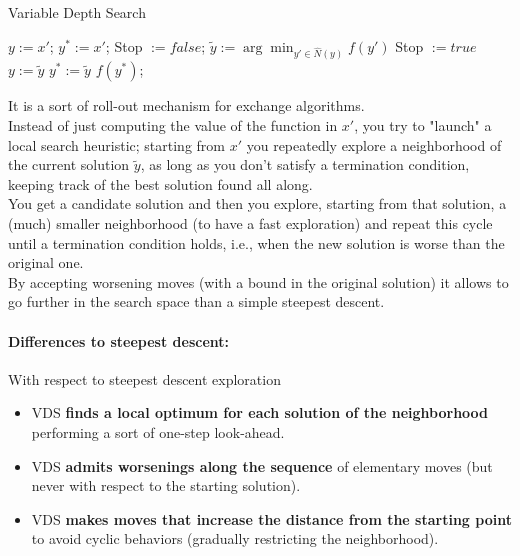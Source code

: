 \begin{algorithm}
	\caption{Variable Depth Search}
	\begin{algorithmic}
		\STATE $y := x'$; $y^\ast := x'$; Stop $:= false$;
		\STATE $\tilde{y} := \arg \min_{y' \in \hat{N}(y)} f(y')$
		\STATE Stop $:= true$
		\ELSE
		\STATE $y := \tilde{y}$
		\ENDIF
		\STATE $y^\ast := \tilde{y}$
		\ENDIF
		\ENDWHILE
		\RETURN $f (y^\ast)$;
	\end{algorithmic}
\end{algorithm}
It is a sort of roll-out mechanism for exchange algorithms.\\

Instead of just computing the value of the function in $x'$, you try to "launch" a local search heuristic; starting from $x'$ you repeatedly explore a neighborhood of the current solution $\tilde{y}$, as long as you don't satisfy a termination condition, keeping track of the best solution found all along.\\

You get a candidate solution and then you explore, starting from that solution, a (much) smaller neighborhood (to have a fast exploration) and repeat this cycle until a termination condition holds, i.e., when the new solution is worse than the original one.\\

By accepting worsening moves (with a bound in the original solution) it allows to go further in the search space than a simple steepest descent.\\

\newpage

\paragraph{Differences to steepest descent:} With respect to steepest descent exploration
\begin{itemize}
	\item VDS \textbf{finds a local optimum for each solution of the neighborhood} performing a sort of one-step look-ahead.\\
	
	\item VDS \textbf{admits worsenings along the sequence} of elementary moves (but never with respect to the starting solution).\\
	
	\item VDS \textbf{makes moves that increase the distance from the starting point} to avoid cyclic behaviors (gradually restricting the neighborhood).\\
\end{itemize}

